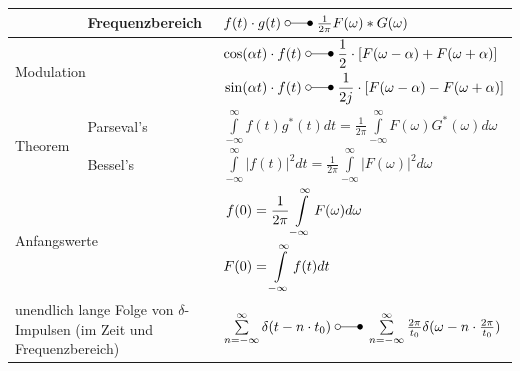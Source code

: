 \begin{tabular}{|p{3cm}|p{6.5cm}p{9cm}|}
	   		\cline{2-3} 
	   		& Frequenzbereich & $f(t) \cdot g(t) \; \laplace \; \frac{1}{2\pi}F(\omega) \ast G(\omega)$ \\ 
   		\hline
   		\hline
   			\multicolumn{2}{|l}{Modulation} & 
   				\begin{math}
   					\begin{aligned}
	   					\cos(\alpha t) \cdot f(t)  \; &\laplace \;  \frac{1}{2}\cdot
	   					\left[F(\omega-\alpha) + F(\omega+\alpha)\right]\\
	   					\sin(\alpha t) \cdot f(t) \; &\laplace \; \frac{1}{2j}\cdot \left[F(\omega-\alpha) - F(\omega+\alpha)\right]
   					\end{aligned}
   				\end{math}	\\ 
   		\hline
   		\hline
   			\multirow{2}{*}{Theorem} & Parseval's & 			 			$\int\limits_{-\infty}^{\infty}f(t)g^{\ast}(t)dt = \frac{1}{2\pi}
   			\int\limits_{-\infty}^{\infty}F(\omega)G^{\ast}(\omega)d\omega$\\ 
   			\cline{2-3} 
   			& Bessel's & $\int\limits_{-\infty}^{\infty}|f(t)|^2 dt = \frac{1}{2\pi}
   			\int\limits_{-\infty}^{\infty}|F(\omega)|^2 d\omega$ \\ 
   		\hline
   		\hline
		   	\multicolumn{2}{|l}{Anfangswerte} & 
		   	\begin{math}
			   	\begin{aligned}
				   	f(0)&=\frac{1}{2\pi}\int\limits_{-\infty}^{\infty}F(\omega)d\omega
				   	\hspace*{1cm}\\
				   	F(0)&=\int\limits_{-\infty}^{\infty}f(t)dt
			   	\end{aligned}
		   	\end{math} \\
		\hline
		\hline
		   	\multicolumn{2}{|l}{unendlich lange Folge von $\delta$-Impulsen (im Zeit und Frequenzbereich)} 
               & $\sum\limits_{n=-\infty}^{\infty} \delta(t-n\cdot t_0) \; \laplace \;
		   	\sum\limits_{n=-\infty}^{\infty} \frac{2\pi}{t_0}\delta(\omega-n\cdot
		   	\frac{2\pi}{t_0})$ \\ 
		\hline
	\end{tabular}




